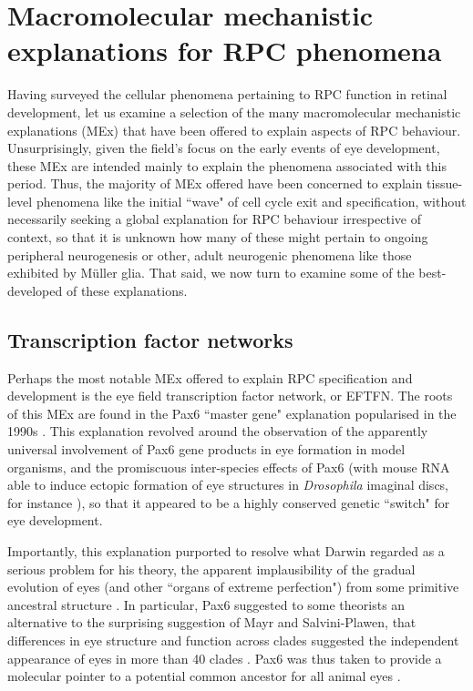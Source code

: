 \section{Macromolecular mechanistic explanations for RPC phenomena}

Having surveyed the cellular phenomena pertaining to RPC function in retinal development, let us examine a selection of the many macromolecular mechanistic explanations (MEx) that have been offered to explain aspects of RPC behaviour. Unsurprisingly, given the field's focus on the early events of eye development, these MEx are intended mainly to explain the phenomena associated with this period. Thus, the majority of MEx offered have been concerned to explain tissue-level phenomena like the initial ``wave" of cell cycle exit and specification, without necessarily seeking a global explanation for RPC behaviour irrespective of context, so that it is unknown how many of these might pertain to ongoing peripheral neurogenesis or other, adult neurogenic phenomena like those exhibited by M{\"u}ller glia. That said, we now turn to examine some of the best-developed of these explanations.

\subsection{Transcription factor networks}

Perhaps the most notable MEx offered to explain RPC specification and development is the eye field transcription factor network, or EFTFN. The roots of this MEx are found in the Pax6 ``master gene" explanation popularised in the 1990s \cite{Gehring1996}. This explanation revolved around the observation of the apparently universal involvement of Pax6 gene products in eye formation in model organisms, and the promiscuous inter-species effects of Pax6 (with mouse RNA able to induce ectopic formation of eye structures in \textit{Drosophila} imaginal discs, for instance \cite{Halder1995}), so that it appeared to be a highly conserved genetic ``switch" for eye development.

Importantly, this explanation purported to resolve what Darwin regarded as a serious problem for his theory, the apparent implausibility of the gradual evolution of eyes (and other ``organs of extreme perfection") from some primitive ancestral structure \cite[p.143-4]{Darwin1888}. In particular, Pax6 suggested to some theorists an alternative to the surprising suggestion of Mayr and Salvini-Plawen, that differences in eye structure and function across clades suggested the independent appearance of eyes in more than 40 clades \cite{v.Salvini-Plawen1977}. Pax6 was thus taken to provide a molecular pointer to a potential common ancestor for all animal eyes \cite{Erclik2009}.

